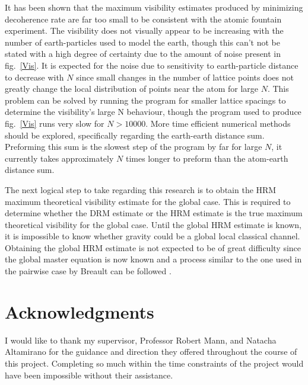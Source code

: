 \documentclass[aps, prd, superscriptaddress,twocolumn,amsmath,amssymb,nofootinbib]{revtex4-1}
\begin{document}
It has been shown that the maximum visibility estimates produced by minimizing decoherence rate are far too small to be consistent with the atomic fountain experiment. The visibility does not visually appear to be increasing with the number of earth-particles used to model the earth, though this can't not be stated with a high degree of certainty due to the amount of noise present in fig.~\ref{Vis}. It is expected for the noise due to sensitivity to earth-particle distance to decrease with $N$ since small changes in the number of lattice points does not greatly change the local distribution of points near the atom for large $N$. This problem can be solved by running the program for smaller lattice spacings to determine the visibility's large N behaviour, though the program used to produce fig.~\ref{Vis} runs very slow for $N>10000$. More time efficient numerical methods should be explored, specifically regarding the earth-earth distance sum. Preforming this sum is the slowest step of the program by far for large $N$, it currently takes approximately $N$ times longer to preform than the atom-earth distance sum.

The next logical step to take regarding this research is to obtain the HRM maximum theoretical visibility estimate for the global case. This is required to determine whether the DRM estimate or the HRM estimate is the true maximum theoretical visibility for the global case. Until the global HRM estimate is known, it is impossible to know whether gravity could be a global local classical channel. Obtaining the global HRM estimate is not expected to be of great difficulty since the global master equation is now known and a process similar to the one used in the pairwise case by Breault can be followed \cite{breault}.


\pagebreak[4]
\section{Acknowledgments}
I would like to thank my supervisor, Professor Robert Mann, and Natacha Altamirano for the guidance and direction they offered throughout the course of this project. Completing so much within the time constraints of the project would have been impossible without their assistance.
\end{document}
